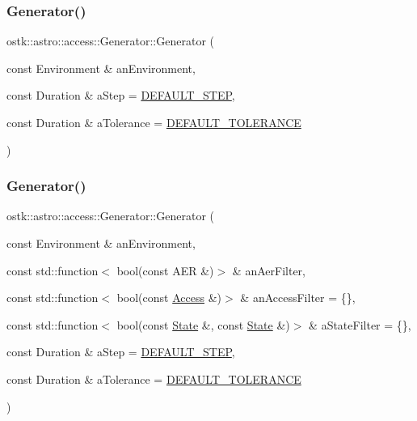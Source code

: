 \subsubsection{\texorpdfstring{Generator()}{Generator()}\hspace{0.1cm}{\footnotesize\ttfamily [1/2]}}
{\footnotesize\ttfamily ostk\+::astro\+::access\+::\+Generator\+::\+Generator (\begin{DoxyParamCaption}\item[{const Environment \&}]{an\+Environment,  }\item[{const Duration \&}]{a\+Step = {\ttfamily \hyperlink{_generator_8hpp_a7ce1d4cc8c33e65c078f721b17b975ea}{D\+E\+F\+A\+U\+L\+T\+\_\+\+S\+T\+EP}},  }\item[{const Duration \&}]{a\+Tolerance = {\ttfamily \hyperlink{_generator_8hpp_a0e355e0dcb761f1b89524e0e77fd14bd}{D\+E\+F\+A\+U\+L\+T\+\_\+\+T\+O\+L\+E\+R\+A\+N\+CE}} }\end{DoxyParamCaption})}

\mbox{\label{classostk_1_1astro_1_1access_1_1_generator_a4997c5e017539c2e5a735ed9a152ae8a}} 
\subsubsection{\texorpdfstring{Generator()}{Generator()}\hspace{0.1cm}{\footnotesize\ttfamily [2/2]}}
{\footnotesize\ttfamily ostk\+::astro\+::access\+::\+Generator\+::\+Generator (\begin{DoxyParamCaption}\item[{const Environment \&}]{an\+Environment,  }\item[{const std\+::function$<$ bool(const A\+ER \&)$>$ \&}]{an\+Aer\+Filter,  }\item[{const std\+::function$<$ bool(const \hyperlink{classostk_1_1astro_1_1_access}{Access} \&)$>$ \&}]{an\+Access\+Filter = {\ttfamily \{\}},  }\item[{const std\+::function$<$ bool(const \hyperlink{classostk_1_1astro_1_1trajectory_1_1_state}{State} \&, const \hyperlink{classostk_1_1astro_1_1trajectory_1_1_state}{State} \&)$>$ \&}]{a\+State\+Filter = {\ttfamily \{\}},  }\item[{const Duration \&}]{a\+Step = {\ttfamily \hyperlink{_generator_8hpp_a7ce1d4cc8c33e65c078f721b17b975ea}{D\+E\+F\+A\+U\+L\+T\+\_\+\+S\+T\+EP}},  }\item[{const Duration \&}]{a\+Tolerance = {\ttfamily \hyperlink{_generator_8hpp_a0e355e0dcb761f1b89524e0e77fd14bd}{D\+E\+F\+A\+U\+L\+T\+\_\+\+T\+O\+L\+E\+R\+A\+N\+CE}} }\end{DoxyParamCaption})}



